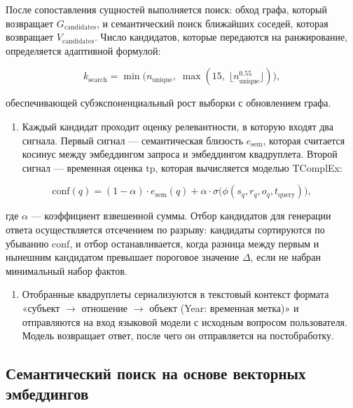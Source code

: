 После сопоставления сущностей выполняется поиск: обход графа, который возвращает $\displaystyle G_{\text{candidates}}$, и семантический поиск ближайших соседей, которая возвращает $\displaystyle V_{\text{candidates}}$. Число кандидатов, которые передаются на ранжирование, определяется адаптивной формулой:

\begin{equation}
    k_{\text{search}} = \min\bigl(n_{\text{unique}},\; \max(15,\; \lfloor n_{\text{unique}}^{0.55} \rfloor)\bigr),
    \label{eq:adaptive_k}
\end{equation}

обеспечивающей субэкспоненциальный рост выборки с обновлением графа.
\begin{enumerate}
    \item[Стадия 3.] Каждый кандидат проходит оценку релевантности, в которую входят два сигнала. Первый сигнал — семантическая близость $\displaystyle e_{\text{sem}}$, которая считается косинус между эмбеддингом запроса и эмбеддингом квадруплета. Второй сигнал — временная оценка $\displaystyle \text{tp}$, которая вычисляется моделью TComplEx:
\end{enumerate}

\begin{equation}
    \text{conf}(q) = (1 - \alpha) \cdot e_{\text{sem}}(q) + \alpha \cdot \sigma\bigl(\phi(s_q, r_q, o_q, t_{\text{query}})\bigr),
    \label{eq:hybrid_confidence}
\end{equation}

где $\displaystyle \alpha$ — коэффициент взвешенной суммы. Отбор кандидатов для генерации ответа осуществляется отсечением по разрыву: кандидаты сортируются по убыванию $\displaystyle \text{conf}$, и отбор останавливается, когда разница между первым и нынешним кандидатом превышает пороговое значение $\displaystyle \Delta$, если не набран минимальный набор фактов.

\begin{enumerate}
    \item[Стадия 4.] Отобранные квадруплеты сериализуются в текстовый контекст формата «субъект $\displaystyle \rightarrow$ отношение $\displaystyle \rightarrow$ объект (Year: временная метка)» и отправляются на вход языковой модели с исходным вопросом пользователя. Модель возвращает ответ, после чего он отправляется на постобработку.
\end{enumerate}


\subsection{Семантический поиск на основе векторных эмбеддингов}
\label{sec:e5_embeddings}


